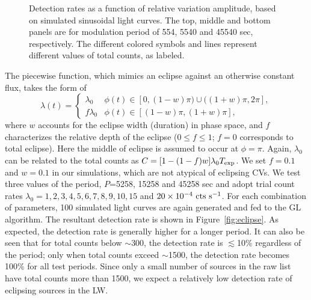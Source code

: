 \documentclass[fleqn,usenatbib]{mnras}
\begin{document}
\begin{figure}
\begin{minipage}[b]{0.45\textwidth}
\end{minipage}
\caption{Detection rates as a function of relative variation amplitude, based on simulated sinusoidal light curves. The top, middle and bottom panels are for modulation period of 554, 5540 and 45540 sec, respectively. The different colored symbols and lines represent different values of total counts, as labeled.
\label{fig:detection}}
\end{figure}

The piecewise function, which mimics an eclipse against an otherwise constant flux, takes the form of
\begin{equation}
\lambda(t)=
\begin{cases}
\lambda_0 & \text{$\phi(t) \in[0,(1-w)\pi)\cup ((1+w)\pi,2\pi]$},\\
f\lambda_0 & \text{$\phi(t) \in[(1-w)\pi,(1+w)\pi]$},
\end{cases}	
\end{equation}
where $w$ accounts for the eclipse width (duration) in phase space, and $f$ characterizes the relative depth of the eclipse ($0\leq f \leq 1$; $f = 0$ corresponds to total eclipse). Here the middle of eclipse is assumed to occur at $\phi = \pi$. 
Again, $\lambda_0$ can be related to the total counts as $C=[1-(1-f)w]\lambda_0T_{\rm exp}$.
We set $f=0.1$ and $w=0.1$ in our simulations, which are not atypical of eclipsing CVs. 
We test three values of the period, $P$=5258, 15258 and 45258 sec and adopt trial count rates $\lambda_0 = 1, 2, 3, 4, 5, 6, 7, 8, 9, 10, 15$ and $20\times10^{-4}{\rm~cts~s^{-1}}$.
For each combination of parameters, 100 simulated light curves are again generated and fed to the GL algorithm. 
The resultant detection rate is shown in Figure~\ref{fig:eclipse}. 
As expected, the detection rate is generally higher for a longer period.
It can also be seen that for total counts below $\sim$300, the detection rate is $\lesssim$10\% regardless of the period; only when total counts exceed $\sim$1500, the detection rate becomes 100\% for all test periods. 
Since only a small number of sources in the raw list have total counts more than 1500, we expect a relatively low detection rate of eclipsing sources in the LW.  
 
\end{document}
